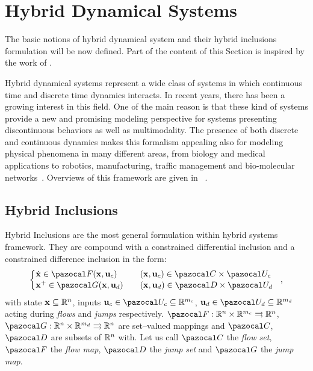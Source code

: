 \section{Hybrid Dynamical Systems\label{sec:HD_systems}}
%
The basic notions of hybrid dynamical system and their hybrid inclusions formulation will be now defined. Part of the content of this Section is inspired by the work of \cite{goebel2009hybrid,Goebel2012}.

Hybrid dynamical systems represent a wide class of systems in which continuous time and discrete time dynamics interacts. In recent years, there has been a growing interest in this field. One of the main reason is that these kind of systems provide a new and promising modeling perspective for systems presenting discontinuous behaviors as well as multimodality. The presence of both discrete and continuous dynamics makes this formalism appealing also for modeling physical phenomena in many different areas, from biology and medical applications to robotics, manufacturing, traffic management and bio-molecular networks~\citep{Aihara4893, Bortolussi2018}. 
Overviews of this framework are given in ~\citep{van2000introduction, haddad2006impulsive,goebel2009hybrid,Goebel2012}.
%
\subsection{Hybrid Inclusions}
%
Hybrid Inclusions are the most general formulation within hybrid systems framework. They are compound with a constrained differential inclusion and a constrained difference inclusion in the form:
%
\begin{equation}\label{eq:hs}
%
\left\{ 
\begin{matrix*}[l]\vspace{1pt}
%
\dot{\xb} \in \F(\xb,\ub_c) &&(\xb,\ub_c)\in\C\times\U_c\\
\xb^+ \in \G(\xb,\ub_d)&&(\xb,\ub_d)\in\D\times\U_d
%
\end{matrix*}
\right.~~,
%
\end{equation}
%
with state $\mathbf{x}\subseteq\mathbb{R}^n$, inputs $\ub_c\in\U_c\subseteq\R^{m_c}$, $\ub_d\in\U_d\subseteq\R^{m_d}$ acting during \textit{flows} and \textit{jumps} respectively. ${\F}:\R^n\times\R^{m_c}\rightrightarrows\R^n$, $\G:\R^n\times\R^{m_d}\rightrightarrows\R^n$ are set--valued mappings and $\C$, $\D$ are subsets of $\mathbb{R}^n$ with. Let us call $\C$ the \textit{flow set}, $\F$ the \textit{flow map}, $\D$ the \textit{jump set} and $\G $ the \textit{jump map}.
%
\newline

